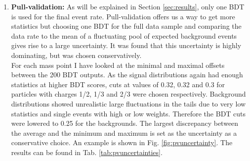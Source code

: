\begin{enumerate}
\item \textbf{Pull-validation: }As will be explained in Section \ref{sec:results}, only one BDT is used for the final event rate. Pull-validation offers us a way to get more statistics but choosing one BDT for the full data sample and comparing the data rate to the mean of a fluctuating pool of expected background events gives rise to a large uncertainty. It was found that this uncertainty is highly dominating, but was chosen conservatively.\\

\noindent For each mass point I have looked at the minimal and maximal offsets between the 200 BDT outputs. As the signal distributions again had enough statistics at higher BDT scores, cuts at values of 0.32, 0.32 and 0.3 for particles with charges 1/2, 1/3 and 2/3 were chosen respectively. Background distributions showed unrealistic large fluctuations in the tails due to very low statistics and single events with high or low weights. Therefore the BDT cuts were lowered to 0.25 for the backgrounds. The largest discrepancy between the average and the minimum and maximum is set as the uncertainty as a conservative choice. An example is shown in Fig. \ref{fig:pvuncertainty}. The results can be found in Tab. \ref{tab:pvuncertainties}.
\end{enumerate}
\vspace{2mm}

\begin{table}[]
\centering
\caption{Results from the detector and flux uncertainties}
\label{tab:detectoruncertainties}
\end{table}

